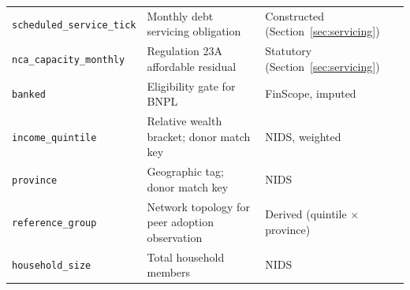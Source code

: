 \begin{table}[H]
\begin{tabular}{L{4.8cm}L{4.4cm}L{4.2cm}}
\texttt{scheduled\_service\_tick} & Monthly debt servicing obligation & Constructed (Section~\ref{sec:servicing}) \\
\texttt{nca\_capacity\_monthly} & Regulation 23A affordable residual & Statutory (Section~\ref{sec:servicing}) \\
\texttt{banked} & Eligibility gate for \ac{BNPL} & FinScope, imputed \\
\texttt{income\_quintile} & Relative wealth bracket; donor match key & NIDS, weighted \\
\texttt{province} & Geographic tag; donor match key & NIDS \\
\texttt{reference\_group} & Network topology for peer adoption observation & Derived (quintile $\times$ province) \\
\texttt{household\_size} & Total household members & NIDS \\
\bottomrule
\end{tabular}
\end{table}
